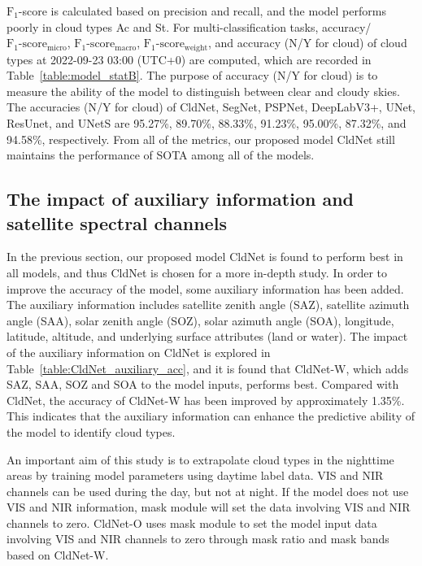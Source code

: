 \documentclass[review]{elsarticle}
\begin{document}
$\mathrm{F_{1}}$-score is calculated based on precision and recall, and the model performs poorly in cloud types Ac and St.
For multi-classification tasks, accuracy/$\mathrm{F_{1}\mbox{-}score_{micro}}$, $\mathrm{F_{1}\mbox{-}score_{macro}}$, $\mathrm{F_{1}\mbox{-}score_{weight}}$, and accuracy (N/Y for cloud) of cloud types at 2022-09-23 03:00 (UTC+0) are computed, which are recorded in Table~\ref{table:model_statB}.
The purpose of accuracy (N/Y for cloud) is to measure the ability of the model to distinguish between clear and cloudy skies.
The accuracies (N/Y for cloud) of CldNet, SegNet, PSPNet, DeepLabV3+, UNet, ResUnet, and UNetS are 95.27\%, 89.70\%, 88.33\%, 91.23\%, 95.00\%, 87.32\%, and 94.58\%, respectively.
From all of the metrics, our proposed model CldNet still maintains the performance of SOTA among all of the models.


\subsection{The impact of auxiliary information and satellite spectral channels} %
In the previous section, our proposed model CldNet is found to perform best in all models, and thus CldNet is chosen for a more in-depth study.
In order to improve the accuracy of the model, some auxiliary information has been added.
The auxiliary information includes satellite zenith angle (SAZ), satellite azimuth angle (SAA), solar zenith angle (SOZ), solar azimuth angle (SOA), longitude, latitude, altitude, and underlying surface attributes (land or water).
The impact of the auxiliary information on CldNet is explored in Table~\ref{table:CldNet_auxiliary_acc}, and it is found that CldNet-W, which adds SAZ, SAA, SOZ and SOA to the model inputs, performs best.
Compared with CldNet, the accuracy of CldNet-W has been improved by approximately 1.35\%.
This indicates that the auxiliary information can enhance the predictive ability of the model to identify cloud types.



An important aim of this study is to extrapolate cloud types in the nighttime areas by training model parameters using daytime label data.
VIS and NIR channels can be used during the day, but not at night.
If the model does not use VIS and NIR information, mask module will set the data involving VIS and NIR channels to zero.
CldNet-O uses mask module to set the model input data involving VIS and NIR channels to zero through mask ratio and mask bands based on CldNet-W.
\end{document}
